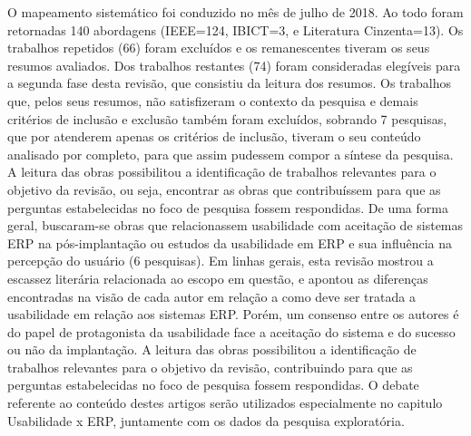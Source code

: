 O mapeamento sistemático foi conduzido no mês de julho de 2018. Ao todo foram retornadas 140 abordagens (IEEE=124, IBICT=3, e Literatura Cinzenta=13). Os trabalhos repetidos (66) foram excluídos e os remanescentes tiveram os seus resumos avaliados. Dos trabalhos restantes (74) foram consideradas elegíveis para a segunda fase desta revisão, que consistiu da leitura dos resumos.\newline
\newline
\indent Os trabalhos que, pelos seus resumos, não satisfizeram o contexto da pesquisa e demais critérios de inclusão e exclusão também foram excluídos, sobrando 7 pesquisas, que por atenderem apenas os critérios de inclusão, tiveram o seu conteúdo analisado por completo, para que assim pudessem compor a síntese da pesquisa.\newline
\newline
\indent A leitura das obras possibilitou a identificação de trabalhos relevantes para o objetivo da revisão, ou seja, encontrar as obras que contribuíssem para que as perguntas estabelecidas no foco de pesquisa fossem respondidas.\newline
\newline
\indent De uma forma geral, buscaram-se obras que relacionassem usabilidade com aceitação de sistemas  ERP na pós-implantação ou estudos da usabilidade em ERP e sua influência na percepção do usuário  (6 pesquisas).\newline
\newline
\indent Em linhas gerais, esta revisão mostrou a escassez literária relacionada ao escopo em questão, e apontou as diferenças encontradas na visão de cada autor em relação a como deve ser tratada a usabilidade em relação aos sistemas ERP. Porém, um consenso entre os  autores é do papel de protagonista da usabilidade face a aceitação do sistema e do sucesso ou não da implantação. A leitura das obras possibilitou a identificação de trabalhos relevantes para o objetivo da revisão, contribuindo para que as perguntas estabelecidas no foco de pesquisa fossem respondidas. O debate referente ao conteúdo destes artigos serão utilizados especialmente no capitulo Usabilidade x ERP, juntamente com os dados da pesquisa exploratória.

\setcounter{chapter}{2}
\renewcommand{\thesection}{\Alph{chapter}.\arabic{section}}
